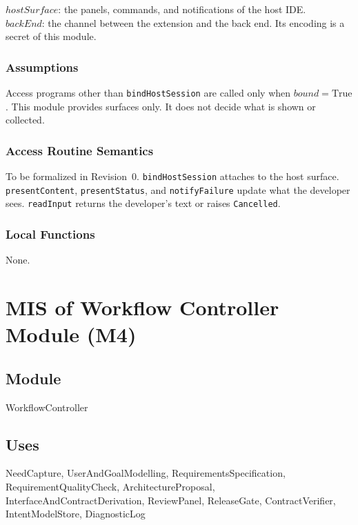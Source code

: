 \documentclass[12pt, titlepage]{article}
\begin{document}
$hostSurface$: the panels, commands, and notifications of the host IDE.\\
$backEnd$: the channel between the extension and the back end. Its encoding is
a secret of this module.

\subsubsection{Assumptions}

Access programs other than \texttt{bindHostSession} are called only when
$bound = \mathrm{True}$. This module provides surfaces only. It does not decide
what is shown or collected.

\subsubsection{Access Routine Semantics}

To be formalized in Revision~0. \texttt{bindHostSession} attaches to the host
surface. \texttt{presentContent}, \texttt{presentStatus}, and
\texttt{notifyFailure} update what the developer sees. \texttt{readInput}
returns the developer's text or raises \texttt{Cancelled}.

\subsubsection{Local Functions}

None.

\newpage
\section{MIS of Workflow Controller Module (M4)} \label{MISControl}

\subsection{Module}

WorkflowController

\subsection{Uses}

NeedCapture, UserAndGoalModelling, RequirementsSpecification,
RequirementQualityCheck, ArchitectureProposal, InterfaceAndContractDerivation,
ReviewPanel, ReleaseGate, ContractVerifier, IntentModelStore, DiagnosticLog
\end{document}
